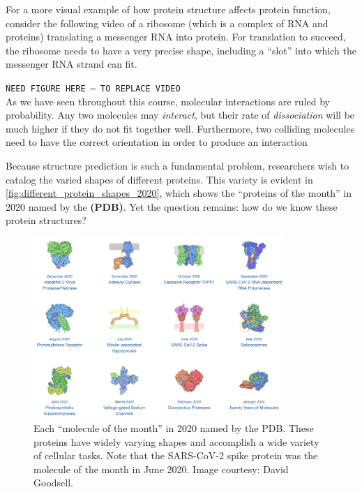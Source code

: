 For a more visual example of how protein structure affects protein function, consider the following video of a ribosome (which is a complex of RNA and proteins) translating a messenger RNA into protein. For translation to succeed, the ribosome needs to have a very precise shape, including a ``slot'' into which the messenger RNA strand can fit.

\texttt{NEED FIGURE HERE -- TO REPLACE VIDEO}\\

As we have seen throughout this course, molecular interactions are ruled by probability. Any two molecules may \textit{interact}, but their rate of \textit{dissociation} will be much higher if they do not fit together well. Furthermore, two colliding molecules need to have the correct orientation in order to produce an interaction

Because structure prediction is such a fundamental problem, researchers wish to catalog the varied shapes of different proteins. This variety is evident in \autoref{fig:different_protein_shapes_2020}, which shows the ``proteins of the month'' in 2020 named by the  \textbf{(PDB)}. Yet the question remains: how do we know these protein structures?

\begin{figure}[h]
	\centering
	\mySfFamily
	\includegraphics[width = 0.85\textwidth]{../images/different_protein_shapes_2020.jpg}
	\caption{Each ``molecule of the month'' in 2020 named by the PDB. These proteins have widely varying shapes and accomplish a wide variety of cellular tasks. Note that the SARS-CoV-2 spike protein was the molecule of the month in June 2020. Image courtesy: David Goodsell.}
	\label{fig:different_protein_shapes_2020}
\end{figure}

